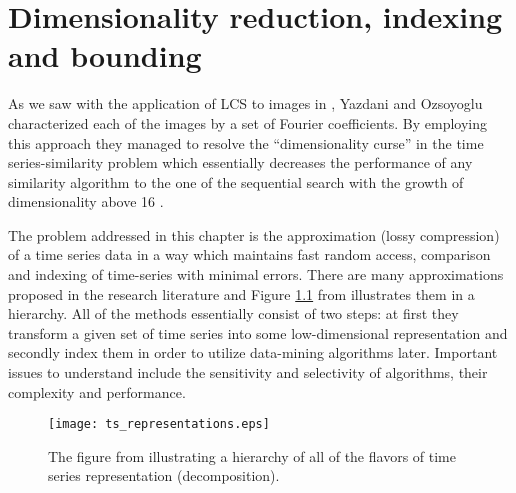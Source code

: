 \chapter{Dimensionality reduction, indexing and bounding}
As we saw with the application of LCS to images in \cite{citeulike:4367061}, Yazdani and Ozsoyoglu characterized each of the images by a set of Fourier coefficients. By employing this approach they managed to resolve the ``dimensionality curse'' in the time series-similarity problem which essentially decreases the performance of any similarity algorithm to the one of the sequential search with the growth of dimensionality above 16 \cite{citeulike:4408223} \cite{citeulike:4384496} \cite{citeulike:2843857} \cite{citeulike:4384489} \cite{citeulike:343069}.

The problem addressed in this chapter is the approximation (lossy compression) of a time series data in a way which maintains fast random access, comparison and indexing of time-series with minimal errors. There are many approximations proposed in the research literature and Figure \ref{fig:approximations} from \cite{citeulike:2821475} illustrates them in a hierarchy. All of the methods essentially consist of two steps: at first they transform a given set of time series into some low-dimensional representation and secondly index them in order to utilize data-mining algorithms later. Important issues to understand include the sensitivity and selectivity of algorithms, their complexity and performance.

\begin{figure}[tbp]
   \centering
   \texttt{[image: ts\_representations.eps]}
   \caption{The figure from \cite{citeulike:2821475} illustrating a hierarchy of all of the flavors of time series representation (decomposition).}
   \label{fig:approximations}
\end{figure} 
